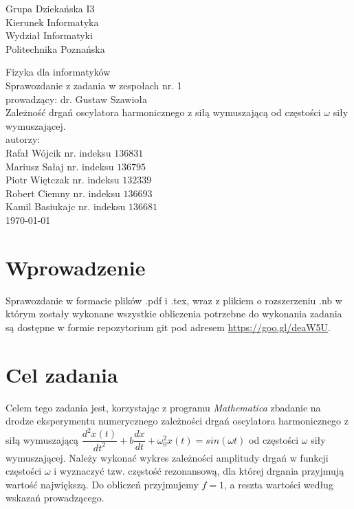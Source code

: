 \documentclass[polish,polish,a4paper]{article}
\title{}
\author{}
\begin{document}
	\begin{titlepage}
			\begin{flushright}
{\large			Grupa Dziekańska I3\\[0.15cm] 
	Kierunek Informatyka\\[0.15cm] 
	Wydział Informatyki\\[0.15cm] 
	Politechnika Poznańska}
		\end{flushright}
			\vspace*{\fill}
				    \begin{center}
				    {\Large Fizyka dla informatyków \\[0.1cm]
				    	Sprawozdanie z zadania w zespołach nr. 1\\[0.1cm]
			    		prowadzący: dr. Gustaw Szawioła\\[0.7cm]}
					{\huge Zależność drgań oscylatora harmonicznego z siłą wymuszającą od częstości $\omega$ siły wymuszającej.\\ [0.7cm]}
					{\large autorzy:}\\[0.1cm]
					{\Large  Rafał Wójcik nr. indeksu $ 136831 $\\Mariusz Sałaj nr. indeksu $136795$\\Piotr Więtczak nr. indeksu $132339$\\ 
						 Robert Ciemny nr. indeksu $136693$\\[0.15cm] Kamil Basiukajc nr. indeksu $136681$}\\[0.5cm]
					\today
				\end{center}
			\vspace*{\fill}
	\end{titlepage}
	
	
	\section{Wprowadzenie}
	Sprawozdanie w formacie plików .pdf i .tex, wraz z plikiem o rozszerzeniu .nb w którym zostały wykonane wszystkie obliczenia potrzebne do wykonania zadania są dostępne w formie repozytorium git pod adresem \linebreak \hyperref{https://goo.gl/deaW5U}{}{}{https://goo.gl/deaW5U}.
	\section{Cel zadania}

	Celem tego zadania jest, korzystając z programu {\em Mathematica} zbadanie na drodze eksperymentu numerycznego zależności drgań oscylatora harmonicznego z siłą wymuszającą $\dfrac{d^{2}x(t)}{dt^{2}} + b \dfrac{dx}{dt} +
	\omega_{0}^2 x(t) = sin(\omega t)$ od częstości $ \omega $ siły wymuszającej. Należy wykonać wykres zależności amplitudy drgań w funkcji częstości $ \omega $ i wyznaczyć tzw. częstość rezonansową, dla której drgania 
	przyjmują wartość największą. Do obliczeń przyjmujemy $f=1$, a reszta wartości według wskazań prowadzącego.
\end{document}
